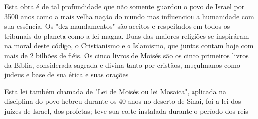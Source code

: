 Esta obra é de tal profundidade que não somente guardou o povo de Israel
por 3500 anos como a mais velha nação do mundo mas influenciou a
huma­nidade com sua essência. Os "dez mandamentos" são aceitos e
respeitados em to­dos os tribunais do planeta como a lei magna. Duas das
maiores religiões se inspirá­ram na moral deste código, o Cristianismo e
o Islamismo, que juntas contam hoje com mais de 2 bilhões de fiéis. Os
cinco livros de Moisés são os cinco primeiros livros da Bíblia,
considerada sagrada e divina tanto por cristãos, muçulmanos como judeus
e base de sua ética e suas orações.

Esta lei também chamada de "Lei de Moisés ou lei Mosaica", aplicada na
disciplina do povo hebreu durante os 40 anos no deserto de Sinai, foi a
lei dos juízes de Israel, dos profetas; teve sua corte instalada durante
o período dos reis

